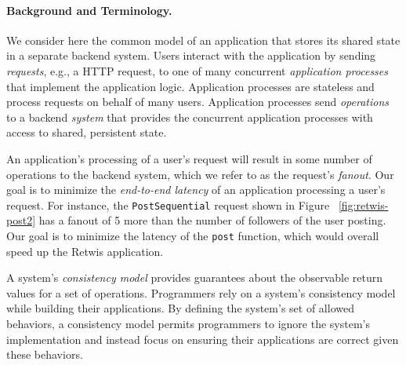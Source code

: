\paragraph{Background and Terminology.}
We consider here the common model of an application that stores its shared state in a separate backend system.
Users interact with the application by sending \textit{requests}, e.g., a HTTP request, to one of many concurrent \textit{application processes} that implement the application logic. Application processes are stateless and process requests on behalf of many users. Application processes send \textit{operations} to a backend \textit{system} that provides the concurrent application processes with access to shared, persistent state.

An application's processing of a user's request will result in some number of operations to the backend system, which we refer to as the request's \textit{fanout}. Our goal is to minimize the \textit{end-to-end latency} of an application processing a user's request. For instance, the \texttt{PostSequential} request shown in Figure ~\ref{fig:retwis-post2} has a fanout of 5 more than the number of followers of the user posting. Our goal is to minimize the latency of the \texttt{post} function, which would overall speed up the Retwis application.

A system's \textit{consistency model} provides guarantees about the observable return values for a set of operations.
Programmers rely on a system's consistency model while building their applications. By defining the system's set of allowed behaviors, a consistency model permits programmers to ignore the system's implementation and instead focus on ensuring their applications are correct given these behaviors.

